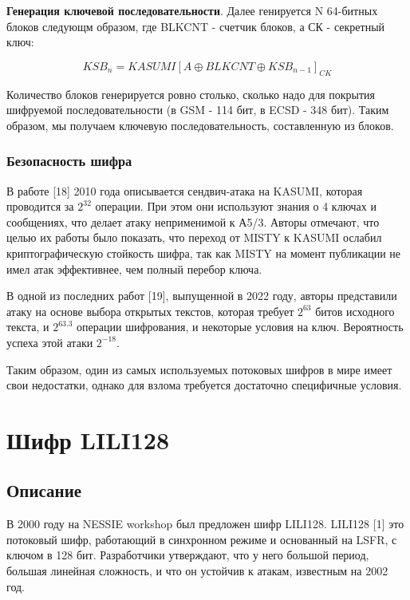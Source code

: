 \documentclass[colorthm]{./civarticle}
\begin{document}
\textbf{Генерация ключевой последовательности}. Далее генируется N 64-битных блоков следующм образом, где BLKCNT - счетчик блоков, а СК - секретный ключ: 

\begin{equation}
    KSB_n = KASUMI[A \oplus BLKCNT \oplus KSB_{n-1}]_{CK}
\end{equation}

Количество блоков генерируется ровно столько, сколько надо для покрытия шифруемой последовательности (в GSM - 114 бит, в ECSD - 348 бит). Таким образом, мы получаем ключевую последовательность, составленную из блоков.

\subsubsection{Безопасность шифра}

В работе [18] 2010 года описывается сендвич-атака на KASUMI, которая проводится за $2^{32}$ операции. При этом они используют знания о 4 ключах и сообщениях, что делает атаку неприменимой к А5/3. Авторы отмечают, что целью их работы было показать, что переход от MISTY к KASUMI ослабил криптографическую стойкость шифра, так как MISTY на момент публикации не имел атак эффективнее, чем полный перебор ключа.

В одной из последних работ [19], выпущенной в 2022 году, авторы представили атаку на основе выбора открытых текстов, которая требует $2^{63}$ битов исходного текста, и $2^{63.3}$ операции шифрования, и некоторые условия на ключ. Вероятность успеха этой атаки $2^{-18}$. 

Таким образом, один из самых используемых потоковых шифров в мире имеет свои недостатки, однако для взлома требуется достаточно специфичные условия.

\section{Шифр LILI128}

\subsection{Описание} 

В 2000 году на NESSIE workshop был предложен шифр LILI128. LILI128 [1] это потоковый шифр, работающий в синхронном режиме и основанный на LSFR, с ключом в 128 бит. Разработчики утверждают, что у него большой период, большая линейная сложность, и что он устойчив к атакам, известным на 2002 год. 
\end{document}
